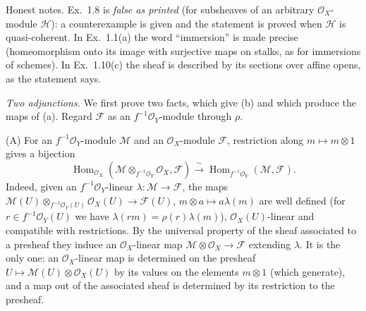 \documentclass[11pt]{article}
\begin{document}
Honest notes. Ex.~1.8 is \emph{false as printed} (for subsheaves of an arbitrary $\mathcal{O}_X$-module $\mathcal{H}$): a counterexample is given and the statement is proved when $\mathcal{H}$ is quasi-coherent. In Ex.~1.1(a) the word ``immersion'' is made precise (homeomorphism onto its image with surjective maps on stalks, as for immersions of schemes). In Ex.~1.10(c) the sheaf is described by its sections over affine opens, as the statement says.

\pf
\emph{Two adjunctions.} We first prove two facts, which give (b) and which produce the maps of (a). Regard $\mathcal{F}$ as an $f^{-1}\mathcal{O}_Y$-module through $\rho$.

(A) For an $f^{-1}\mathcal{O}_Y$-module $\mathcal{M}$ and an $\mathcal{O}_X$-module $\mathcal{F}$, restriction along $m\mapsto m\otimes1$ gives a bijection
\[ \operatorname{Hom}_{\mathcal{O}_X}(\mathcal{M}\otimes_{f^{-1}\mathcal{O}_Y}\mathcal{O}_X,\mathcal{F})\xrightarrow{\ \sim\ }\operatorname{Hom}_{f^{-1}\mathcal{O}_Y}(\mathcal{M},\mathcal{F}). \]
Indeed, given an $f^{-1}\mathcal{O}_Y$-linear $\lambda:\mathcal{M}\to\mathcal{F}$, the maps $\mathcal{M}(U)\otimes_{f^{-1}\mathcal{O}_Y(U)}\mathcal{O}_X(U)\to\mathcal{F}(U)$, $m\otimes a\mapsto a\lambda(m)$ are well defined (for $r\in f^{-1}\mathcal{O}_Y(U)$ we have $\lambda(rm)=\rho(r)\lambda(m)$), $\mathcal{O}_X(U)$-linear and compatible with restrictions. By the universal property of the sheaf associated to a presheaf they induce an $\mathcal{O}_X$-linear map $\mathcal{M}\otimes\mathcal{O}_X\to\mathcal{F}$ extending $\lambda$. It is the only one: an $\mathcal{O}_X$-linear map is determined on the presheaf $U\mapsto\mathcal{M}(U)\otimes\mathcal{O}_X(U)$ by its values on the elements $m\otimes1$ (which generate), and a map out of the associated sheaf is determined by its restriction to the presheaf.
\end{document}
